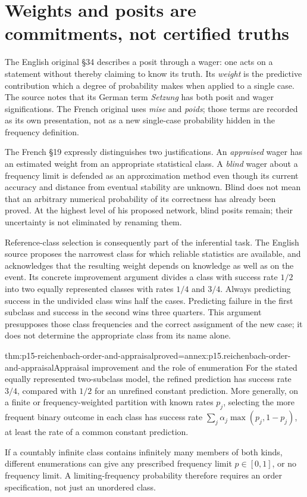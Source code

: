 \section{Weights and posits are commitments, not certified truths}
\label{sec:p15-reichenbach-posits}

The English original §34 describes a posit through a wager: one acts
on a statement without thereby claiming to know its truth. Its
\emph{weight} is the predictive contribution which a degree of
probability makes when applied to a single case. The source notes
that its German term \emph{Setzung} has both posit and wager
significations. The French original uses \emph{mise} and
\emph{poids}; those terms are recorded as its own presentation,
not as a new single-case probability hidden in the frequency definition.

The French §19 expressly distinguishes two justifications. An
\emph{appraised} wager has an estimated weight from an appropriate
statistical class. A \emph{blind} wager about a frequency limit is
defended as an approximation method even though its current accuracy
and distance from eventual stability are unknown. Blind does not mean
that an arbitrary numerical probability of its correctness has already
been proved. At the highest level of his proposed network, blind
posits remain; their uncertainty is not eliminated by renaming them.

Reference-class selection is consequently part of the inferential task.
The English source proposes the narrowest class for which reliable
statistics are available, and acknowledges that the resulting weight
depends on knowledge as well as on the event. Its concrete improvement
argument divides a class with success rate \(1/2\) into two equally
represented classes with rates \(1/4\) and \(3/4\). Always predicting
success in the undivided class wins half the cases. Predicting failure
in the first subclass and success in the second wins three quarters.
This argument presupposes those class frequencies and the correct
assignment of the new case; it does not determine the appropriate class
from its name alone.

\begin{hbtheorem}{thm:p15-reichenbach-order-and-appraisal}{proved=annex:p15.reichenbach-order-and-appraisal}{Appraisal improvement and the role of enumeration}
For the stated equally represented two-subclass model, the refined
prediction has success rate \(3/4\), compared with \(1/2\) for
an unrefined constant prediction. More generally, on a finite or
frequency-weighted partition with known rates \(p_j\), selecting
the more frequent binary outcome in each class has success rate
\(\sum_j\alpha_j\max(p_j,1-p_j)\), at least the rate of a
common constant prediction.

If a countably infinite class contains infinitely many members of both
kinds, different enumerations can give any prescribed frequency limit
\(p\in[0,1]\), or no frequency limit. A limiting-frequency
probability therefore requires an order specification, not just an
unordered class.
\end{hbtheorem}

